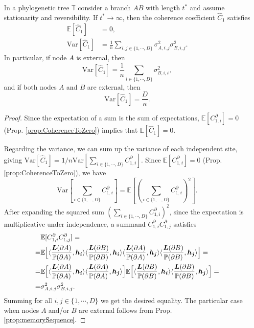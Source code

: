 \begin{appendices}
\medskip
 
\begin{prop} \label{prop:variance_coherence_D}  In a phylogenetic tree $\mathbb{T}$ consider a branch $AB$ with length $t^*$ and assume stationarity and reversibility.  If $t^* \to \infty$, then the coherence coefficient $\hat{C}_1$ satisfies
\begin{align}
 \mathbb{E}[\hat{C}_1] &= 0,\\
 \mathrm{Var}[\hat{C}_1] &= \frac{1}{n}\sum_{i, j \in \{1,\cdots, D\}} 
   \sigma^2_{A,i,j}   \sigma^2_{B,i,j}.
\end{align}
In particular, if node $A$ is external, then 
\begin{equation} \label{eq:externalMultiple}
 \mathrm{Var}[\hat{C}_1]= \frac{1}{n}\sum_{i \in \{1,\cdots, D\}} 
      \sigma^2_{B, i, i},
\end{equation}
and if both nodes $A$ and $B$ are external, then 
\begin{equation}
 \mathrm{Var}[\hat{C}_1] = \frac{D}{n}.
 \end{equation}
\end{prop}
\begin{proof} Since the expectation of a sum is the sum of expectations, $\mathbb{E}[C_{1,i}^\partial] = 0$ (Prop. \ref{prop:CoherenceToZero}) implies that  $\mathbb{E}[\hat{C}_1] = 0$. 
 
 \medskip
 
 Regarding the variance, we can sum up the variance of each independent site, giving $\mathrm{Var}[\hat{C}_1] = 1/n  \mathrm{Var}[\sum_{i \in \{1,\cdots,D\}}C^\partial_{1,i}] $. Since $\mathbb{E}[C^\partial_{1,i}] = 0$ (Prop. \ref{prop:CoherenceToZero}), we have 
 \begin{equation} \label{eq:VarianceExpected}
     \mathrm{Var}[\sum_{i \in \{1,\cdots, D\}}C^\partial_{1,i}] =\mathbb{E}[(\sum_{i \in \{1,\cdots, D\}}C^\partial_{1,i})^2 ].
 \end{equation}
 After expanding the squared sum $(\sum_{i \in \{1,\cdots, D\}}C^\partial_{1,i})^2$, since the expectation is multiplicative under independence, a summand 
 $C^\partial_{1,i} C^\partial_{1,j}$ satisfies
  \begin{align}
 &\mathbb{E}[C^\partial_{1,i} C^\partial_{1,j}] = \\
 =& \mathbb{E}\Big[\langle \frac{{ \bm{L}(\partial A) }}{\mathbb{P}({\partial A})},\bm{h_i}\rangle \langle \frac{{ \bm{L}(\partial B) }}{\mathbb{P}({\partial B})}, \bm{h_i} \rangle \langle \frac{{ \bm{L}(\partial A) }}{\mathbb{P}({\partial A})},\bm{h_j}\rangle \langle \frac{{ \bm{L}(\partial B) }}{\mathbb{P}({\partial B})}, \bm{h_j} \rangle\Big]= \nonumber\\
  =& \mathbb{E}\Big[\langle \frac{{ \bm{L}(\partial A) }}{\mathbb{P}({\partial A})},\bm{h_i}\rangle \langle \frac{{ \bm{L}(\partial A) }}{\mathbb{P}({\partial A})},\bm{h_j}\rangle \Big]  \mathbb{E}\Big[\langle \frac{{ \bm{L}(\partial B) }}{\mathbb{P}({\partial B})}, \bm{h_i} \rangle \langle \frac{{ \bm{L}(\partial B) }}{\mathbb{P}({\partial B})}, \bm{h_j} \rangle\Big]= \nonumber\\
  =& \sigma^2_{A,i,j}   \sigma^2_{B,i,j}.\nonumber
 \end{align}
 Summing for all $i,j \in \{1,\cdots, D\}$ we get the desired equality.  The particular case when nodes $A$ and/or $B$ are external follows from Prop. \ref{prop:memorySequence}.
 

\end{proof}
\end{appendices}
